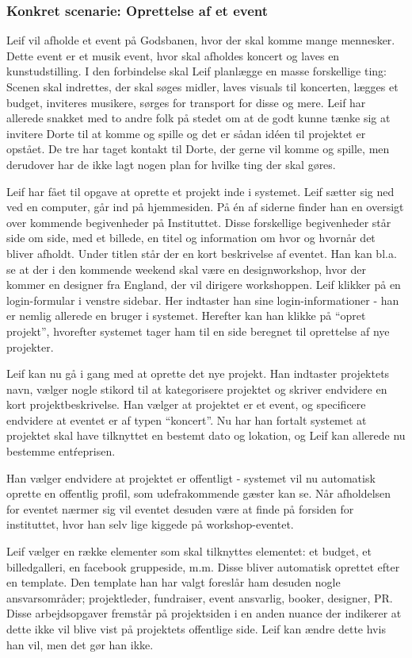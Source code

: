 \subsubsection{Konkret scenarie: Oprettelse af et event}
Leif vil afholde et event på Godsbanen, hvor der skal komme mange mennesker. Dette event er et musik event, hvor skal afholdes koncert og laves en kunstudstilling. I den forbindelse skal Leif planlægge en masse forskellige ting: Scenen skal indrettes, der skal søges midler, laves visuals til koncerten, lægges et budget, inviteres musikere, sørges for transport for disse og mere.
Leif har allerede snakket med to andre folk på stedet om at de godt kunne tænke sig at invitere Dorte til at komme og spille og det er sådan idéen til projektet er opstået. De tre har taget kontakt til Dorte, der gerne vil komme og spille, men derudover har de ikke lagt nogen plan for hvilke ting der skal gøres.

Leif har fået til opgave at oprette et projekt inde i systemet. Leif sætter sig ned ved en computer, går ind på hjemmesiden. På én af siderne finder han en oversigt over kommende begivenheder på Instituttet. Disse forskellige begivenheder står side om side, med et billede, en titel og information om hvor og hvornår det bliver afholdt. Under titlen står der en kort beskrivelse af eventet. Han kan bl.a. se at der i den kommende weekend skal være en designworkshop, hvor der kommer en designer fra England, der vil dirigere workshoppen. 
Leif klikker på en login-formular i venstre sidebar. Her indtaster han sine login-informationer - han er nemlig allerede en bruger i systemet. Herefter kan han klikke på “opret projekt”, hvorefter systemet tager ham til en side beregnet til oprettelse af nye projekter. 

Leif kan nu gå i gang med at oprette det nye projekt. Han indtaster projektets navn, vælger nogle stikord til at kategorisere projektet og skriver endvidere en kort projektbeskrivelse.
Han vælger at projektet er et event, og specificere endvidere at eventet er af typen “koncert”. Nu har han fortalt systemet at projektet skal have tilknyttet en bestemt dato og lokation, og Leif kan allerede nu bestemme entŕeprisen. 

Han vælger endvidere at projektet er offentligt - systemet vil nu automatisk oprette en offentlig profil, som udefrakommende gæster kan se. Når afholdelsen for eventet nærmer sig vil eventet desuden være at finde på forsiden for instituttet, hvor han selv lige kiggede på workshop-eventet.

Leif vælger en række elementer som skal tilknyttes elementet: et budget, et billedgalleri, en facebook gruppeside, m.m. Disse bliver automatisk oprettet efter en template.
Den template han har valgt foreslår ham desuden nogle ansvarsområder; projektleder, fundraiser, event ansvarlig, booker, designer, PR. Disse arbejdsopgaver fremstår på projektsiden i en anden nuance der indikerer at dette ikke vil blive vist på projektets offentlige side. Leif kan ændre dette hvis han vil, men det gør han ikke. 

